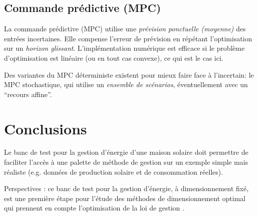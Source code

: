 \documentclass[a4paper,10pt,twocolumn]{article}
\begin{document}
\subsection{Commande prédictive (MPC)}
La commande prédictive (MPC) utilise une \emph{prévision ponctuelle (moyenne)} des entrées incertaines.
Elle compense l'erreur de prévision en répétant l'optimisation sur un \emph{horizon glissant}.
L'implémentation numérique est efficace si le problème d'optimisation est linéaire (ou en tout cas convexe),
ce qui est le cas ici.

Des variantes du MPC déterministe existent pour mieux faire face à l'incertain: le MPC stochastique,
qui utilise un \emph{ensemble de scénarios}, éventuellement avec un ``recours affine''.



% 
% 


\section{Conclusions}

Le banc de test pour la gestion d'énergie d'une maison solaire
doit permettre de faciliter l'accès à une palette de méthode de gestion
sur un exemple simple mais réaliste (e.g. données de production solaire et de consommation réelles).

Perspectives : ce banc de test pour la gestion d'énergie,
à dimensionnement fixé, est une première étape pour l'étude des méthodes
de dimensionnement optimal qui prennent en compte l'optimisation de la loi de gestion
\cite{Haessig:2014:SGE}.




\end{document}
